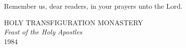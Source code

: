 Remember us, dear readers, in your prayers unto the Lord.

{
	\vspace{.5cm}
	\hspace*{\fill} {\color{red}HOLY TRANSFIGURATION MONASTERY}
	\vspace{.5cm}
}\\
\textit{Feast of the Holy Apostles}\\
1984